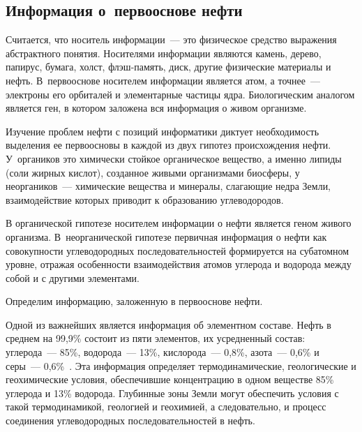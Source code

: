 \begin{multicols}{2}
\section{Информация о~первооснове нефти}
     
     Считается, что носитель информации~--- это физическое средство выражения 
абстрактного понятия. Носителями информации являются камень, дерево, папирус, 
бумага, холст, флэш-память, диск, другие физические материалы и нефть. 
В~первооснове носителем информации является атом, а точнее~--- электроны его 
орбиталей и элементарные частицы ядра. Биологическим аналогом является ген, в 
котором заложена вся информация о живом организме. 
     
     Изучение проблем нефти с позиций информатики диктует необходимость 
выделения ее первоосновы в каждой из двух гипотез происхождения нефти. 
У~органиков это химически стойкое органическое вещество, а именно липиды 
(соли жирных кислот), созданное живыми организмами биосферы, у 
     неоргаников~--- химические вещества и минералы, слагающие недра Земли, 
взаимодействие которых приводит к образованию углеводородов. 
     
     В органической гипотезе носителем информации о нефти является геном 
живого организма. В~неорганической гипотезе первичная информация о нефти как 
совокупности углеводородных последовательностей формируется на субатомном 
уровне, отражая особенности взаимодействия атомов углерода и водорода между 
собой и с другими элементами. 
     
     Определим информацию, заложенную в первооснове нефти. 
     
     Одной из важнейших является информация об элементном составе. Нефть в 
среднем на 99,9\% состоит из пяти элементов, их усредненный состав: 
углерода~--- 85\%, водорода~--- 13\%, кислорода~--- 0,8\%, азота~--- 0,6\% и серы~--- 
0,6\%~\cite{16s}. Эта информация определяет термодинамические, геологические и 
геохимические условия, обеспечившие концентрацию в одном веществе 85\% 
углерода и 13\% водорода. Глубинные зоны Земли могут обеспечить условия с 
такой термодинамикой, геологией и геохимией, а следовательно, и процесс 
соединения углеводородных последовательностей в нефть.
{

}
     

\end{multicols}
